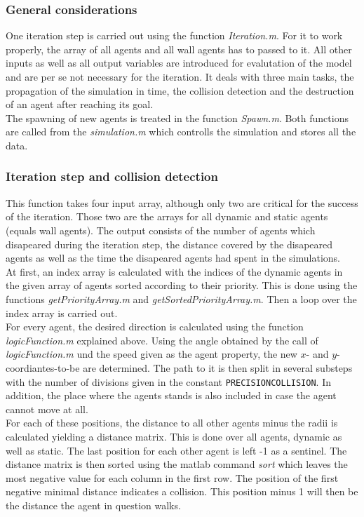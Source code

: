 
\subsubsection{General considerations}
One iteration step is carried out using the function \textit{Iteration.m}. For it to work properly, the array of all agents and all wall agents has to passed to it. All other inputs as well as all output variables are introduced for evalutation of the model and are per se not necessary for the iteration. It deals with three main tasks, the propagation of the simulation in time, the collision detection and the destruction of an agent after reaching its goal.\\
The spawning of new agents is treated in the function \textit{Spawn.m}. Both functions are called from the \textit{simulation.m} which controlls the simulation and stores all the data.

\subsubsection{Iteration step and collision detection}
This function takes four input array, although only two are critical for the success of the iteration. Those two are the arrays for all dynamic and static agents (equals wall agents). The output consists of the number of agents which disapeared during the iteration step, the distance covered by the disapeared agents as well as the time the disapeared agents had spent in the simulations.\\
At first, an index array is calculated with the indices of the dynamic agents in the given array of agents sorted according to their priority. This is done using the functions \textit{getPriorityArray.m} and \textit{getSortedPriorityArray.m}. Then a loop over the index array is carried out.\\
For every agent, the desired direction is calculated using the function \textit{logicFunction.m} explained above. Using the angle obtained by the call of \textit{logicFunction.m} und the speed given as the agent property, the new $x$- and $y$-coordiantes-to-be are determined. The path to it is then split in several substeps with the number of divisions given in the constant \texttt{PRECISIONCOLLISION}. In addition, the place where the agents stands is also included in case the agent cannot move at all.\\
For each of these positions, the distance to all other agents minus the radii is calculated yielding a distance matrix. This is done over all agents, dynamic as well as static. The last position for each other agent is left -1 as a sentinel. The distance matrix is then sorted using the matlab command \textit{sort} which leaves the most negative value for each column in the first row. The position of the first negative minimal distance indicates a collision. This position minus 1 will then be the distance the agent in question walks.\\

